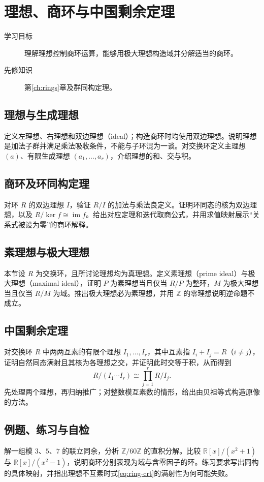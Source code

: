 \setcounter{chapter}{10} %
\chapter{理想、商环与中国剩余定理}\label{ch:ideals}

\begin{description}
  \item[学习目标] 理解理想控制商环运算，能够用极大理想构造域并分解适当的商环。
  \item[先修知识] 第\ref{ch:rings}章及群同构定理。
\end{description}

\section{理想与生成理想}
定义左理想、右理想和双边理想（ideal）；构造商环时均使用双边理想。说明理想是加法子群并满足乘法吸收条件，不能与子环混为一谈。对交换环定义主理想 $(a)$、有限生成理想 $(a_1,\ldots,a_r)$，介绍理想的和、交与积。

\section{商环及环同构定理}
对环 $R$ 的双边理想 $I$，验证 $R/I$ 的加法与乘法良定义。证明环同态的核为双边理想，以及 $R/\ker f\cong\operatorname{im}f$。给出对应定理和迭代取商公式，并用求值映射展示“关系式被设为零”的商环解释。

\section{素理想与极大理想}
本节设 $R$ 为交换环，且所讨论理想均为真理想。定义素理想（prime ideal）与极大理想（maximal ideal），证明 $P$ 为素理想当且仅当 $R/P$ 为整环，$M$ 为极大理想当且仅当 $R/M$ 为域。推出极大理想必为素理想，并用 $\mathbb Z$ 的零理想说明逆命题不成立。

\section{中国剩余定理}
对交换环 $R$ 中两两互素的有限个理想 $I_1,\ldots,I_r$，其中互素指 $I_i+I_j=R$（$i\ne j$），证明自然同态满射且其核为各理想之交，并证明此时交等于积，从而得到
\begin{equation}\label{eq:ring-crt}
  R/(I_1\cdots I_r)\cong\prod_{j=1}^{r}R/I_j.
\end{equation}
先处理两个理想，再归纳推广；对整数模互素数的情形，给出由贝祖等式构造原像的方法。

\section{例题、练习与自检}
解一组模 $3$、$5$、$7$ 的联立同余，分析 $\mathbb Z/60\mathbb Z$ 的直积分解。比较 $\mathbb R[x]/(x^2+1)$ 与 $\mathbb R[x]/(x^2-1)$，说明商环分别表现为域与含零因子的环。练习要求写出同构的具体映射，并指出理想不互素时式\eqref{eq:ring-crt}的满射性为何可能失败。

